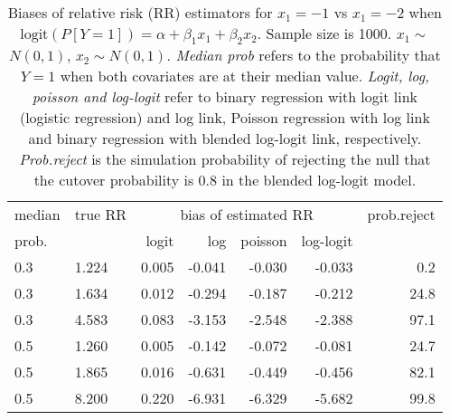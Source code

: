 \documentclass[12pt,a4paper]{article}
\begin{document}
\begin{table}[H] 
\small\sf\centering 
\caption{Biases of relative risk (RR) estimators for $x_1=-1$ vs $x_1=-2$ when $\mbox{logit}(P[Y=1])=\alpha+\beta_1 x_1 + \beta_2 x_2$. Sample size is 1000. $x_1 \sim $$N(0,1)$, $x_2 \sim N(0,1)$. {\it Median prob} refers to the probability that $Y=1$ when both covariates are at their median value. {\it Logit, log, poisson and log-logit} refer to binary regression with logit link (logistic regression) and log link, Poisson regression with log link and binary regression with blended log-logit link, respectively. {\it Prob.reject} is the simulation probability of rejecting the null that the cutover probability is $0.8$ in the blended log-logit model.} 
\begin{tabular}{llrrrrr} 
\toprule 
median & true RR & \multicolumn{4}{c}{bias of estimated RR} & prob.reject \\ 
prob. & & logit & log & poisson & log-logit  & \\ \midrule 
0.3 & 1.224 & 0.005 & -0.041 & -0.030 & -0.033 &  0.2 \\  
0.3 & 1.634 & 0.012 & -0.294 & -0.187 & -0.212 & 24.8 \\  
0.3 & 4.583 & 0.083 & -3.153 & -2.548 & -2.388 & 97.1 \\  
0.5 & 1.260 & 0.005 & -0.142 & -0.072 & -0.081 & 24.7 \\  
0.5 & 1.865 & 0.016 & -0.631 & -0.449 & -0.456 & 82.1 \\  
0.5 & 8.200 & 0.220 & -6.931 & -6.329 & -5.682 & 99.8 \\  
\bottomrule 
\end{tabular} 
\end{table} 
\end{document}
